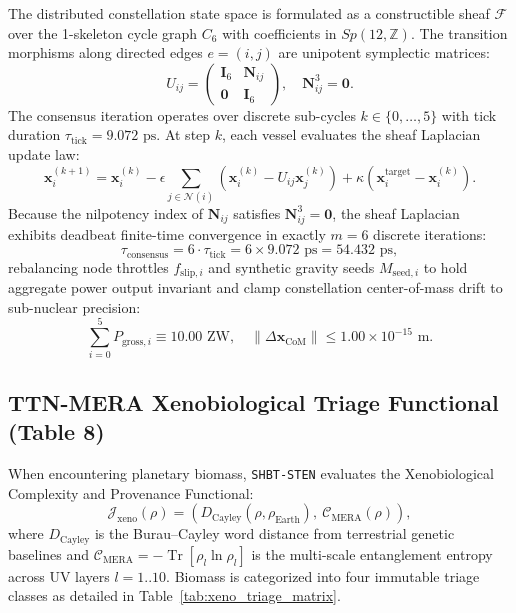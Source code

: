 \documentclass[11pt,onecolumn]{article}
\DeclareMathOperator{\Tr}{Tr}
\begin{document}
The distributed constellation state space is formulated as a constructible sheaf $\mathcal{F}$ over the 1-skeleton cycle graph $C_6$ with coefficients in $Sp(12, \mathbb{Z})$. The transition morphisms along directed edges $e = (i, j)$ are unipotent symplectic matrices:
\begin{equation}
U_{ij} = \begin{pmatrix} \mathbf{I}_6 & \mathbf{N}_{ij} \\ \mathbf{0} & \mathbf{I}_6 \end{pmatrix}, \quad \mathbf{N}_{ij}^3 = \mathbf{0}.
\label{eq:hexamer_unipotent_morphism}
\end{equation}
The consensus iteration operates over discrete sub-cycles $k \in \{0, \dots, 5\}$ with tick duration $\tau_{\text{tick}} = 9.072\text{ ps}$. At step $k$, each vessel evaluates the sheaf Laplacian update law:
\begin{equation}
\mathbf{x}_i^{(k+1)} = \mathbf{x}_i^{(k)} - \epsilon \sum_{j \in \mathcal{N}(i)} \left( \mathbf{x}_i^{(k)} - U_{ij} \mathbf{x}_j^{(k)} \right) + \kappa \left( \mathbf{x}_i^{\text{target}} - \mathbf{x}_i^{(k)} \right).
\label{eq:hexamer_sheaf_laplacian}
\end{equation}
Because the nilpotency index of $\mathbf{N}_{ij}$ satisfies $\mathbf{N}_{ij}^3 = \mathbf{0}$, the sheaf Laplacian exhibits deadbeat finite-time convergence in exactly $m = 6$ discrete iterations:
\begin{equation}
\tau_{\text{consensus}} = 6 \cdot \tau_{\text{tick}} = 6 \times 9.072\text{ ps} = 54.432\text{ ps},
\label{eq:hexamer_convergence_time}
\end{equation}
rebalancing node throttles $f_{\text{slip}, i}$ and synthetic gravity seeds $M_{\text{seed}, i}$ to hold aggregate power output invariant and clamp constellation center-of-mass drift to sub-nuclear precision:
\begin{equation}
\sum_{i=0}^5 P_{\text{gross}, i} \equiv 10.00\text{ ZW}, \quad \|\Delta \mathbf{x}_{\text{CoM}}\| \le 1.00 \times 10^{-15}\text{ m}.
\label{eq:hexamer_invariants}
\end{equation}

\subsection{TTN-MERA Xenobiological Triage Functional (Table 8)}
When encountering planetary biomass, \texttt{SHBT-STEN} evaluates the Xenobiological Complexity and Provenance Functional:
\begin{equation}
\mathcal{J}_{\text{xeno}}(\rho) = \left( D_{\text{Cayley}}(\rho, \rho_{\text{Earth}}), \ \mathcal{C}_{\text{MERA}}(\rho) \right),
\label{eq:xeno_triage_functional}
\end{equation}
where $D_{\text{Cayley}}$ is the Burau--Cayley word distance from terrestrial genetic baselines and $\mathcal{C}_{\text{MERA}} = -\Tr[\rho_l \ln \rho_l]$ is the multi-scale entanglement entropy across UV layers $l = 1..10$. Biomass is categorized into four immutable triage classes as detailed in Table~\ref{tab:xeno_triage_matrix}.
\end{document}
